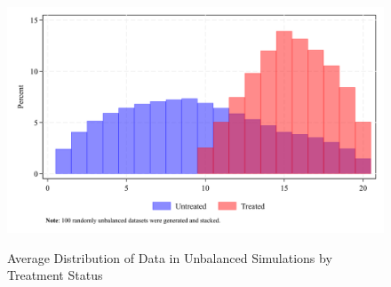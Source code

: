 \documentclass[12pt]{article}
\begin{document}
\begin{figure}
    \centering
    \caption{Average Distribution of Data in Unbalanced Simulations by Treatment Status}
    \includegraphics[width=6in]{Figures/Average Distribution of Data in Unbalanced Simulations by Treated.png}
    \label{fig:dist-treat}
\end{figure}

\end{document}
